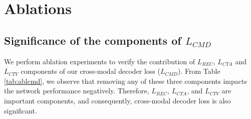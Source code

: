 \documentclass[10pt,twocolumn,letterpaper]{article}
\begin{document}
\section{Ablations}

\subsection{Significance of the components of $L_{CMD}$}
We perform ablation experiments to verify the contribution of $L_{REC}$, $L_{CTA}$ and $L_{CTV}$ components of our cross-modal decoder loss ($L_{CMD}$). From Table \ref{tab:ablcmd}, we observe that removing any of these three components impacts the network performance negatively. Therefore, $L_{REC}$, $L_{CTA}$, and $L_{CTV}$ are important components, and consequently, cross-modal decoder loss is also significant.
  \begin{table}[t]
 \centering
{}
 \caption{Ablation study to verify the contribution of $L_{TA}$, $L_{AT}$, $L_{TV}$ and $L_{VT}$ components of $L_{CT}$ on AVGZSLNet (eq wt) for generalized zero-shot classification (\% mAcc).}
 \label{tab:abltrip}
\vspace{-15pt}
 \end{table}
 
\end{document}
